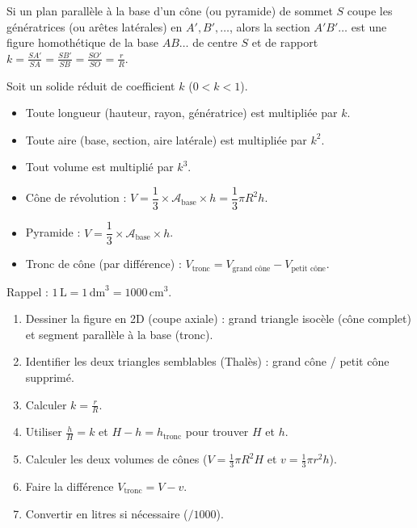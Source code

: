 \documentclass[11pt]{article}
\newcounter{popsec}
\newcounter{popsub}
\newcommand{\courssub}[1]{%
  \stepcounter{popsub}%
  \par\vspace{9pt}\noindent{\popxbold\fontsize{11.5}{13}\selectfont\color{popink}{\color{poporange}\thepopsec.\thepopsub}\hspace{6pt}#1}\par\nopagebreak\vspace{4pt}
}
\begin{document}
\courssub{Ressources à mobiliser}
\begin{propriete}
Si un plan parallèle à la base d'un cône (ou pyramide) de sommet $S$ coupe les génératrices (ou arêtes latérales) en $A', B', \dots$, alors la section $A'B'\dots$ est une figure homothétique de la base $AB\dots$ de centre $S$ et de rapport $k = \frac{SA'}{SA} = \frac{SB'}{SB} = \frac{SO'}{SO} = \frac{r}{R}$.
\end{propriete}

\begin{propriete}
Soit un solide réduit de coefficient $k$ ($0 < k < 1$).
\begin{itemize}
    \item Toute longueur (hauteur, rayon, génératrice) est multipliée par $k$.
    \item Toute aire (base, section, aire latérale) est multipliée par $k^2$.
    \item Tout volume est multiplié par $k^3$.
\end{itemize}
\end{propriete}

\begin{aretenir}
\begin{itemize}
    \item Cône de révolution : $V = \dfrac{1}{3} \times \mathcal{A}_{\text{base}} \times h = \dfrac{1}{3}\pi R^2 h$.
    \item Pyramide : $V = \dfrac{1}{3} \times \mathcal{A}_{\text{base}} \times h$.
    \item Tronc de cône (par différence) : $V_{\text{tronc}} = V_{\text{grand cône}} - V_{\text{petit cône}}$.
\end{itemize}
Rappel : $1\,\text{L} = 1\,\text{dm}^3 = 1000\,\text{cm}^3$.
\end{aretenir}

\begin{methode}
\begin{enumerate}
    \item Dessiner la figure en 2D (coupe axiale) : grand triangle isocèle (cône complet) et segment parallèle à la base (tronc).
    \item Identifier les deux triangles semblables (Thalès) : grand cône / petit cône supprimé.
    \item Calculer $k = \frac{r}{R}$.
    \item Utiliser $\frac{h}{H} = k$ et $H - h = h_{\text{tronc}}$ pour trouver $H$ et $h$.
    \item Calculer les deux volumes de cônes ($V = \frac{1}{3}\pi R^2 H$ et $v = \frac{1}{3}\pi r^2 h$).
    \item Faire la différence $V_{\text{tronc}} = V - v$.
    \item Convertir en litres si nécessaire ($/1000$).
\end{enumerate}
\end{methode}
\end{document}
